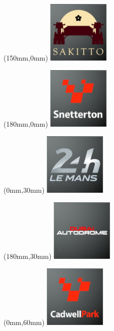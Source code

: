 \begin{textblock*}{30mm}(150mm,0mm)%
\includegraphics[width=30mm]{LG/2015-05-20_00093.png}
\end{textblock*}
\begin{textblock*}{30mm}(180mm,0mm)%
\includegraphics[width=30mm]{LG/2015-05-20_00095.png}
\end{textblock*}
\begin{textblock*}{30mm}(0mm,30mm)%
\includegraphics[width=30mm]{LG/2015-05-20_00084.png}
\end{textblock*}
\begin{textblock*}{30mm}(180mm,30mm)%
\includegraphics[width=30mm]{LG/2015-05-20_00081.png}
\end{textblock*}
\begin{textblock*}{30mm}(0mm,60mm)%
\includegraphics[width=30mm]{LG/2015-05-20_00076.png}
\end{textblock*}
